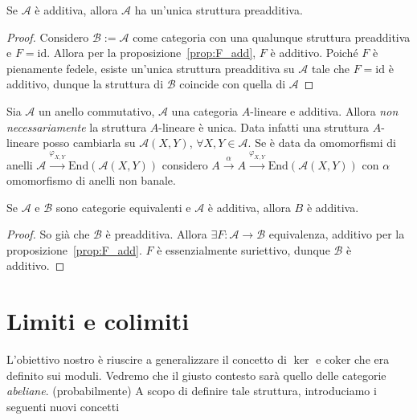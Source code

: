\begin{corollary}{}
    Se \(\mathcal{A}\) è additiva, allora \(\mathcal{A}\) ha un'unica struttura
    preadditiva.
\end{corollary}
\begin{proof}{}
    Considero \(\mathcal{B} := \mathcal{A}\) come categoria con una qualunque
    struttura preadditiva e \(F = \mathrm{id}\). Allora per la
    proposizione~\ref{prop:F_add}, \(F\) è additivo. Poiché \(F\) è pienamente
    fedele, esiste un'unica struttura preadditiva su \(\mathcal{A}\) tale che \(F=\mathrm{id}\) è additivo, dunque la struttura di \(\mathcal{B}\) coincide con quella di \(\mathcal{A}\) 
\end{proof}
\begin{remark}{}
    Sia \(\mathcal{A}\) un anello commutativo, \(\mathcal{A}\) una categoria
    \(A\)-lineare e additiva. Allora \emph{non necessariamente} la struttura
    \(A\)-lineare è unica. Data infatti una struttura \(A\)-lineare posso
    cambiarla su \(\mathcal{A}{(X, Y)}\), \(\forall X, Y \in \mathcal{A}\). Se è
    data da omomorfismi di anelli \(\mathcal{A} \overset{\varphi_{X,Y} }{\to } \mathrm{End}{(\mathcal{A}{(X, Y)})}\)
    considero \(A \overset{\alpha}{\to } A \overset{\varphi_{X, Y} }{\to } \mathrm{End}{(\mathcal{A}{(X, Y)})}\) con \(\alpha\) omomorfismo di anelli non banale. %
\end{remark}
\begin{corollary}{}
    Se \(\mathcal{A}\) e \(\mathcal{B}\) sono categorie equivalenti e \(\mathcal{A}\) è additiva, allora \(B\) è additiva.
\end{corollary}
\begin{proof}
    So già che \(\mathcal{B}\) è preadditiva. Allora \(\exists F: \mathcal{A} \to \mathcal{B}\) equivalenza, additivo per la proposizione~\ref{prop:F_add}.
    \(F\) è essenzialmente suriettivo, dunque \(\mathcal{B}\) è additivo.
\end{proof}

\section{Limiti e colimiti}

L'obiettivo nostro è riuscire a generalizzare il concetto di \(\ker\) e \(\mathrm{coker}\)
che era definito sui moduli. Vedremo che il giusto contesto sarà quello delle
categorie \emph{abeliane}. (probabilmente) A scopo di definire tale struttura,
introduciamo i seguenti nuovi concetti

